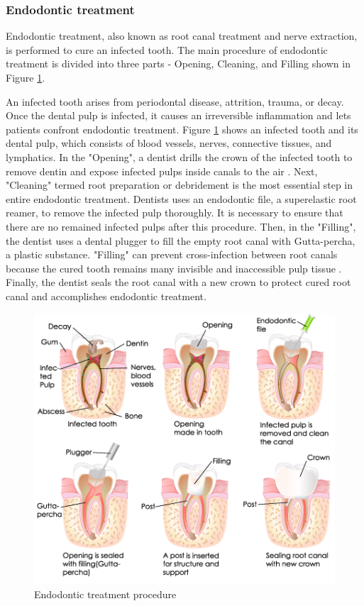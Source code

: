 \subsubsection{Endodontic treatment}
\hspace*{6mm}Endodontic treatment, also known as root canal treatment and nerve extraction, is performed to cure an infected tooth. The main procedure of endodontic treatment is divided into three parts - Opening, Cleaning, and Filling shown in  Figure \ref{fig:endo-procedure}.
\par
An infected tooth arises from periodontal disease, attrition, trauma, or decay. Once the dental pulp is infected, it causes an irreversible inflammation and lets patients confront endodontic treatment. Figure \ref{fig:endo-procedure} shows an infected tooth and its dental pulp, which consists of blood vessels, nerves, connective tissues, and lymphatics. In the "Opening", a dentist drills the crown of the infected tooth to remove dentin and expose infected pulps inside canals to the air \cite{GUTMANN2011150}. Next,  "Cleaning" termed root preparation or debridement is the most essential step in entire endodontic treatment. Dentists uses an endodontic file, a superelastic root reamer, to remove the infected pulp thoroughly. It is necessary to ensure that there are no remained infected pulps \cite{GUTMANN2011195} after this procedure. Then, in the "Filling", the dentist uses a dental plugger to fill the empty root canal with Gutta-percha, a plastic substance. "Filling" can prevent cross-infection between root canals because the cured tooth remains many invisible and inaccessible pulp tissue \cite{GUTMANN2011218}. Finally, the dentist seals the root canal with a new crown to protect cured root canal and accomplishes endodontic treatment. 
\begin{figure}[htbp]
\begin{center}
\includegraphics[width=0.75\linewidth]{Images/endo-procedure.png}
\caption[Endodontic treatment procedure]{Endodontic treatment procedure \cite{web7}}
\label{fig:endo-procedure}
\end{center}
\end{figure}
